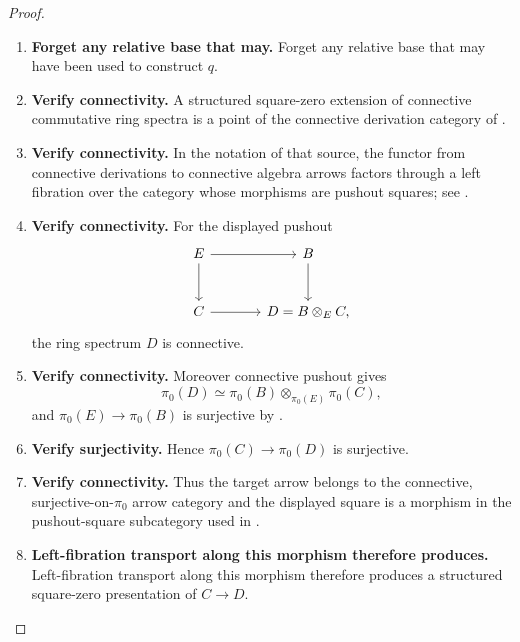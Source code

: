 \begin{proof}
\leavevmode
\begin{enumerate}[label=\textup{(\arabic*)}]
    \item \textbf{Forget any relative base that may.}
    Forget any relative base that may have been used to construct \(q\).

    \item \textbf{Verify connectivity.}
    A structured square-zero extension of connective commutative ring spectra is a point of the
    connective derivation category of \cite{LurieDAGIV}.

    \item \textbf{Verify connectivity.}
    In the notation of that source, the functor from connective derivations to connective
    algebra arrows factors through a left fibration over the category whose morphisms are
    pushout squares; see \cite[Theorem~3.25]{LurieDAGIV}.

    \item \textbf{Verify connectivity.}
    For the displayed pushout
    \[
    \begin{tikzcd}[column sep=large,row sep=large]
        E \arrow[r] \arrow[d] & B \arrow[d] \\
        C \arrow[r] & D=B\otimes_EC,
    \end{tikzcd}
    \]
    the ring spectrum \(D\) is connective.

    \item \textbf{Verify connectivity.}
    Moreover connective pushout gives
    \[
        \pi_0(D)
        \simeq
        \pi_0(B)\otimes_{\pi_0(E)}\pi_0(C),
    \]
    and \(\pi_0(E)\to\pi_0(B)\) is surjective by .

    \item \textbf{Verify surjectivity.}
    Hence \(\pi_0(C)\to\pi_0(D)\) is surjective.

    \item \textbf{Verify connectivity.}
    Thus the target arrow belongs to the connective, surjective-on-\(\pi_0\) arrow category
    and the displayed square is a morphism in the pushout-square subcategory used in
    \cite[Theorem~3.25]{LurieDAGIV}.

    \item \textbf{Left-fibration transport along this morphism therefore produces.}
    Left-fibration transport along this morphism therefore produces a structured square-zero
    presentation of \(C\to D\).


\end{enumerate}
\end{proof}
